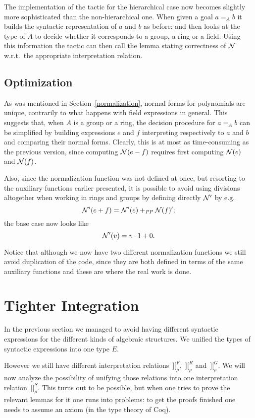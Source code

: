 \documentclass[runningheads]{llncs}
\newcommand{\intII}{\,]\![}
\newcommand{\intrelG}{\mathbin{\intII_\rho^G}}
\newcommand{\intrelF}{\mathbin{\intII_\rho^F}}
\newcommand{\intrelR}{\mathbin{\intII_\rho^R}}
\newcommand{\intrelS}{\mathbin{\intII_\rho^S}}
\newcommand{\N}{{\cal N}}
\begin{document}
The implementation of the tactic for the hierarchical case now becomes slightly more
sophisticated than the non-hierarchical one.
When given a goal $a=_A b$ it builds the syntactic representation of
$a$ and $b$ as before; and then looks at the type of $A$ to decide
whether it corresponds to a group, a ring or a field.
Using this information the tactic can then call the lemma stating correctness
of $\N$ w.r.t.\ the appropriate interpretation relation.

\subsection*{Optimization}

As was mentioned in Section~\ref{normalization}, normal forms for
polynomials are unique, contrarily to what happens with field expressions
in general.
This suggests that, when $A$ is a group or a ring, the decision procedure
for $a=_Ab$ can be simplified by building expressions $e$ and $f$
interpreting respectively to $a$ and $b$ and comparing their normal forms.
Clearly, this is at most as time-consuming as the previous version, since
computing $\N(e-f)$ requires first computing $\N(e)$ and $\N(f)$.

Also, since the normalization function was not defined at once, but
resorting to the auxiliary functions earlier presented, it is possible
to avoid using divisions altogether when working in rings and groups
by defining directly $\N'$ by e.g.
\[\N'(e+f)=\N'(e)+_{\it PP}\N(f)';\]
\noindent the base case now looks like
\[\N'(v)=v\cdot1+0.\]

\noindent
Notice that although we now have two different normalization functions
we still avoid duplication of the code, since they are both defined in
terms of the same auxiliary functions and these are where the real work is
done.

\section{Tighter Integration}\label{integration} %

In the previous section we managed to avoid having different syntactic
expressions for the different kinds of algebraic structures.
We unified the types of syntactic expressions into one type $E$.

However we still have different interpretation relations $\intrelF$,
$\intrelR$ and $\intrelG$.
We will now analyze the possibility of unifying those relations
into one interpretation relation $\intrelS$.
This turns out to be possible,
but when one tries to prove the relevant lemmas for it
one runs into problems: to get the proofs finished one needs
to assume an axiom (in the type theory of Coq).
\end{document}
